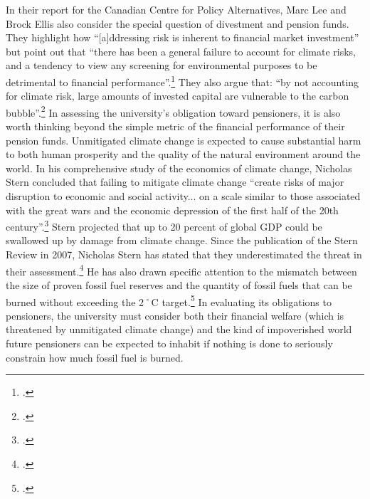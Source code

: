 \documentclass[10pt]{article}
\begin{document}
In their report for the Canadian Centre for Policy Alternatives, Marc Lee and Brock Ellis also consider the special question of divestment and pension funds.
They highlight how ``[a]ddressing risk is inherent to financial market investment'' but point out that ``there has been a general failure to account for climate risks, and a tendency to view any screening for environmental purposes to be detrimental to financial performance''.\footcite[][p.8--9]{CanadaCarbonLiabilities}
They also argue that: ``by not accounting for climate risk, large amounts of invested capital are vulnerable to the carbon bubble''.\footcite[][p.9]{CanadaCarbonLiabilities}
In assessing the university's obligation toward pensioners, it is also worth thinking beyond the simple metric of the financial performance of their pension funds.
Unmitigated climate change is expected to cause substantial harm to both human prosperity and the quality of the natural environment around the world.
In his comprehensive study of the economics of climate change, Nicholas Stern concluded that failing to mitigate climate change ``create risks of major disruption to economic and social activity... on a scale similar to those associated with the great wars and the economic depression of the first half of the 20th century''.\footcite[][See also: \url{http://www.hm-treasury.gov.uk/d/Executive_Summary.pdf}]{Stern2007}
Stern projected that up to 20 percent of global GDP could be swallowed up by damage from climate change.
Since the publication of the Stern Review in 2007, Nicholas Stern has stated that they underestimated the threat in their assessment.\footcite{Stern2008}
He has also drawn specific attention to the mismatch between the size of proven fossil fuel reserves and the quantity of fossil fuels that can be burned without exceeding the 2˚C target.\footcite[][]{FTOvervalued}
In evaluating its obligations to pensioners, the university must consider both their financial welfare (which is threatened by unmitigated climate change) and the kind of impoverished world future pensioners can be expected to inhabit if nothing is done to seriously constrain how much fossil fuel is burned.
\end{document}
